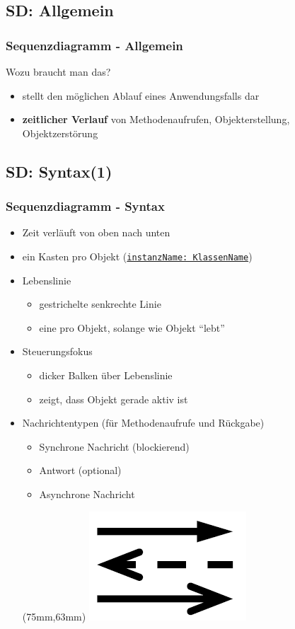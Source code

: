 \documentclass[18pt]{beamer}
\begin{document}
	\subsection{SD: Allgemein}
	\begin{frame}
		\frametitle{Sequenzdiagramm - Allgemein}
		\begin{block}{Wozu braucht man das?}
			\pause
			\begin{itemize}
				\item stellt den möglichen Ablauf eines Anwendungsfalls dar
				\item \textbf{zeitlicher Verlauf} von Methodenaufrufen, Objekterstellung, Objektzerstörung
			\end{itemize}
		\end{block}
	\end{frame}

	\subsection{SD: Syntax(1)}
	\begin{frame}
		\frametitle{Sequenzdiagramm - Syntax}
		\begin{itemize}
			\item Zeit verläuft von oben nach unten
			\item ein Kasten pro Objekt (\texttt{\underline{instanzName: KlassenName}})
			\item Lebenslinie
			\begin{itemize}
				\item gestrichelte senkrechte Linie
				\item eine pro Objekt, solange wie Objekt \enquote{lebt}
			\end{itemize}
			\item Steuerungsfokus
			\begin{itemize}
				\item dicker Balken über Lebenslinie
				\item zeigt, dass Objekt gerade aktiv ist
			\end{itemize}
			\item Nachrichtentypen (für Methodenaufrufe und Rückgabe)
			\begin{itemize}
				\item Synchrone Nachricht (blockierend)
				\item Antwort (optional)
				\item Asynchrone Nachricht
			\end{itemize}
			\begin{textblock*}{20mm}(75mm,63mm)
				\includegraphics[scale=0.4]{./pics/tut2/sd_met.png}
			\end{textblock*}
		\end{itemize}
	\end{frame}
\end{document}
